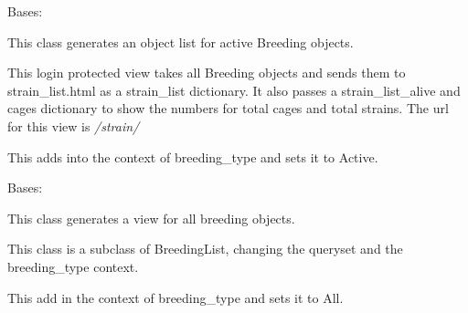 \documentclass[letterpaper,10pt,english]{sphinxmanual}
\begin{document}

\begin{fulllineitems}
\label{api:mousedb.animal.views.BreedingList}
Bases: {\hyperref[api:mousedb.views.ProtectedListView]{}}

This class generates an object list for active Breeding objects.

This login protected view takes all Breeding objects and sends them to strain\_list.html as a strain\_list dictionary.  It also passes a strain\_list\_alive and cages dictionary to show the numbers for total cages and total strains.
The url for this view is \emph{/strain/}


\begin{fulllineitems}
\label{api:mousedb.animal.views.BreedingList.get_context_data}
This adds into the context of breeding\_type and sets it to Active.

\end{fulllineitems}


\end{fulllineitems}



\begin{fulllineitems}
\label{api:mousedb.animal.views.BreedingListAll}
Bases: {\hyperref[api:mousedb.animal.views.BreedingList]{}}

This class generates a view for all breeding objects.

This class is a subclass of BreedingList, changing the queryset and the  breeding\_type context.


\begin{fulllineitems}
\label{api:mousedb.animal.views.BreedingListAll.get_context_data}
This add in the context of breeding\_type and sets it to All.

\end{fulllineitems}


\end{fulllineitems}
\end{document}
